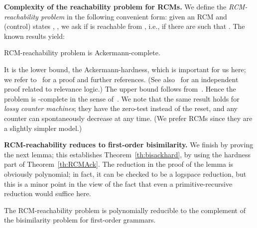 \documentclass[a4paper,11pt]{article}
\begin{document}
\textbf{Complexity of the reachability problem for RCMs.}
We define the \emph{RCM-reachability problem} in the following
convenient form: given an RCM  and (control) states
, , we ask if  is reachable from
, i.e., if there are 
such that
.
The known results yield:

\begin{theorem}\label{th:RCMAck}
RCM-reachability problem is Ackermann-complete.
\end{theorem}

It is the lower bound, the  Ackermann-hardness, which is important
for us here; we refer to~\cite{DBLP:conf/mfcs/Schnoebelen10} for a proof 
and further references.
(See also~\cite{DBLP:journals/jsyml/Urquhart99}
for an independent proof related to relevance logic.)
The upper bound follows from~\cite{DBLP:conf/lics/FigueiraFSS11}.
Hence the problem is
-complete in the sense of~\cite{Schmitz2013}.
We note that the same result holds for
\emph{lossy counter machines}; they have the zero-test instead of the
reset, and any counter can spontaneously decrease at any time.
(We prefer RCMs since they are a slightly simpler model.)

\textbf{RCM-reachability reduces to first-order bisimilarity.}
We finish by proving  the next lemma; this establishes 
Theorem~\ref{th:bisackhard}, by 
using the hardness part of Theorem~\ref{th:RCMAck}.
The reduction in the proof of the lemma is obviously polynomial; in
fact, it can be checked to be a logspace reduction, 
but this is a minor point in the view of the fact that even a 
primitive-recursive reduction would suffice here.

\begin{lemma}
The RCM-reachability problem is polynomially reducible to the complement 
of the bisimilarity problem for
first-order grammars.
\end{lemma}
\end{document}
